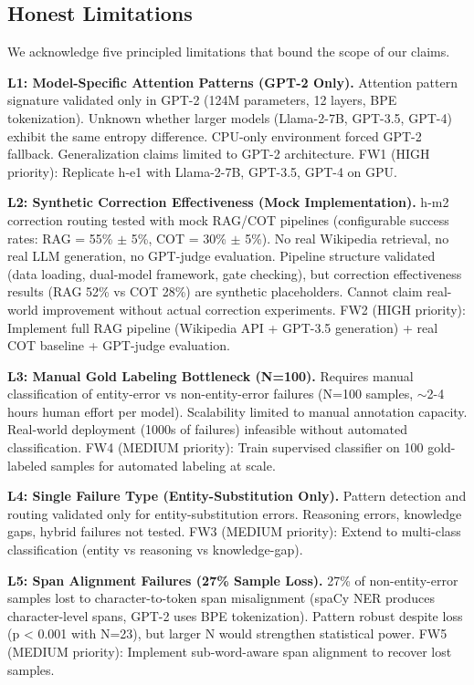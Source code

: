 \subsection{Honest Limitations}

We acknowledge five principled limitations that bound the scope of our claims.

\textbf{L1: Model-Specific Attention Patterns (GPT-2 Only).} Attention pattern signature validated only in GPT-2 (124M parameters, 12 layers, BPE tokenization). Unknown whether larger models (Llama-2-7B, GPT-3.5, GPT-4) exhibit the same entropy difference. CPU-only environment forced GPT-2 fallback. Generalization claims limited to GPT-2 architecture. FW1 (HIGH priority): Replicate h-e1 with Llama-2-7B, GPT-3.5, GPT-4 on GPU.

\textbf{L2: Synthetic Correction Effectiveness (Mock Implementation).} h-m2 correction routing tested with mock RAG/COT pipelines (configurable success rates: RAG = 55\% $\pm$ 5\%, COT = 30\% $\pm$ 5\%). No real Wikipedia retrieval, no real LLM generation, no GPT-judge evaluation. Pipeline structure validated (data loading, dual-model framework, gate checking), but correction effectiveness results (RAG 52\% vs COT 28\%) are synthetic placeholders. Cannot claim real-world improvement without actual correction experiments. FW2 (HIGH priority): Implement full RAG pipeline (Wikipedia API + GPT-3.5 generation) + real COT baseline + GPT-judge evaluation.

\textbf{L3: Manual Gold Labeling Bottleneck (N=100).} Requires manual classification of entity-error vs non-entity-error failures (N=100 samples, $\sim$2-4 hours human effort per model). Scalability limited to manual annotation capacity. Real-world deployment (1000s of failures) infeasible without automated classification. FW4 (MEDIUM priority): Train supervised classifier on 100 gold-labeled samples for automated labeling at scale.

\textbf{L4: Single Failure Type (Entity-Substitution Only).} Pattern detection and routing validated only for entity-substitution errors. Reasoning errors, knowledge gaps, hybrid failures not tested. FW3 (MEDIUM priority): Extend to multi-class classification (entity vs reasoning vs knowledge-gap).

\textbf{L5: Span Alignment Failures (27\% Sample Loss).} 27\% of non-entity-error samples lost to character-to-token span misalignment (spaCy NER produces character-level spans, GPT-2 uses BPE tokenization). Pattern robust despite loss (p < 0.001 with N=23), but larger N would strengthen statistical power. FW5 (MEDIUM priority): Implement sub-word-aware span alignment to recover lost samples.
